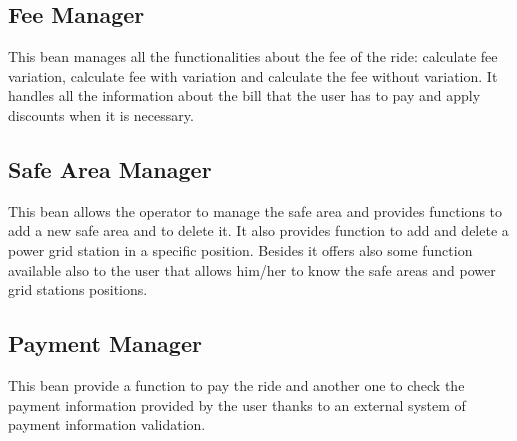 \subsection{Fee Manager}
This bean manages all the functionalities about the fee of the ride: calculate fee variation, calculate fee with variation and calculate the fee without variation.
It handles all the information about the bill that the user has to pay and apply discounts when it is necessary.

\subsection{Safe Area Manager}
This bean allows the operator to manage the safe area and provides functions to add a new safe area and to delete it. It also provides function to add and delete a power grid station in a specific position.
Besides it offers also some function available also to the user that allows him/her to know the safe areas and power grid stations positions.

\subsection{Payment Manager}
This bean provide a function to pay the ride and another one to check the payment information provided by the user thanks to an external system of payment information validation.